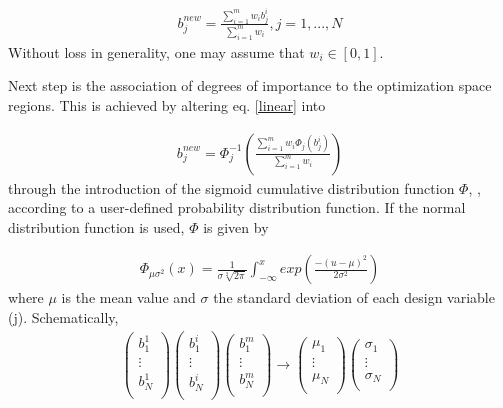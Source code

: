 \begin{eqnarray}
   b_j^{new} = \frac{\sum_{i=1}^{m}w_i b_j^i}{\sum_{i=1}^{m}w_i }, j=1,...,N 
   \label{linear} 
\end{eqnarray}
Without loss in generality, one may assume that $w_i \in [0,1]$. 

Next step is the association of degrees of importance to the optimization space regions. This is achieved by altering eq. \ref{linear} into

\begin{eqnarray}
   b_j^{new} = \Phi _j^{-1} (\frac{\sum_{i=1}^{m}w_i \Phi _j(b_j^i)}{\sum_{i=1}^{m}w_i }) 
   \label{non-linear} 
\end{eqnarray}
through the introduction of the sigmoid cumulative distribution function $\Phi$,  \cite{Kiemele}, according to a user-defined probability distribution function. If the normal distribution function is used, $\Phi$ is given by

\begin{eqnarray}
   \Phi _{\mu \sigma ^2} (x)= \frac{1}{\sigma\sqrt[2]{2\pi}}\int _{-\infty}^x exp(\frac{-(u-\mu)^2}{2 \sigma^2}) 
   \label{cdf} 
\end{eqnarray}
where $\mu$ is the mean value and $\sigma$ the standard deviation of each design variable (j). Schematically,
\begin{eqnarray}
		\left( {\begin{array}{c}
 		b_1^1  \\
 		\vdots  \\
 		b_N^1	\\
 		\end{array} } \right) 
 		\left( {\begin{array}{c}
 		b_1^i  \\
 		\vdots  \\
 		b_N^i	\\
 		\end{array} } \right)
 		\left( {\begin{array}{c}
 		b_1^m  \\
 		\vdots  \\
 		b_N^m	\\
 		\end{array} } \right) \rightarrow
		\left( {\begin{array}{c}
 		\mu _1  \\
 		\vdots  \\
 		\mu _N  \\
 		\end{array} } \right)
		\left( {\begin{array}{c}
 		\sigma _1  \\
 		\vdots  \\
 		\sigma _N  \\
 		\end{array} } \right)
   \label{cdf-matrix} 
\end{eqnarray}


